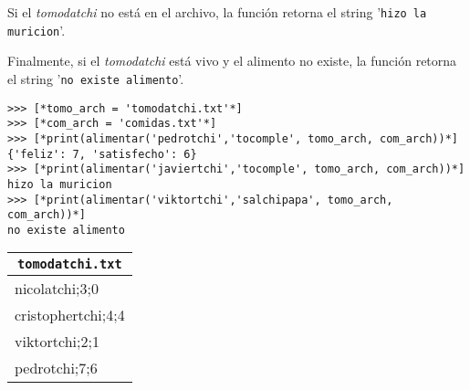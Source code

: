 \begin{enumerate}
    Si el \textit{tomodatchi} no está en el archivo, la función retorna el string '\texttt{hizo la muricion}'. 
    
    Finalmente, si el \textit{tomodatchi} está vivo y el alimento no existe, la función retorna el string '\texttt{no existe alimento}'.

    \begin{lstlisting}[style=consola]
>>> [*tomo_arch = 'tomodatchi.txt'*]
>>> [*com_arch = 'comidas.txt'*]
>>> [*print(alimentar('pedrotchi','tocomple', tomo_arch, com_arch))*]
{'feliz': 7, 'satisfecho': 6}
>>> [*print(alimentar('javiertchi','tocomple', tomo_arch, com_arch))*]
hizo la muricion
>>> [*print(alimentar('viktortchi','salchipapa', tomo_arch, com_arch))*]
no existe alimento
    \end{lstlisting}
\end{enumerate}


\begin{center}
	\begin{tabular}{|l|}
\multicolumn{1}{c}{\texttt{tomodatchi.txt}}\\
		\hline
nicolatchi;3;0\\
cristophertchi;4;4\\
viktortchi;2;1\\
pedrotchi;7;6\\
		\hline
	\end{tabular}
\end{center}

